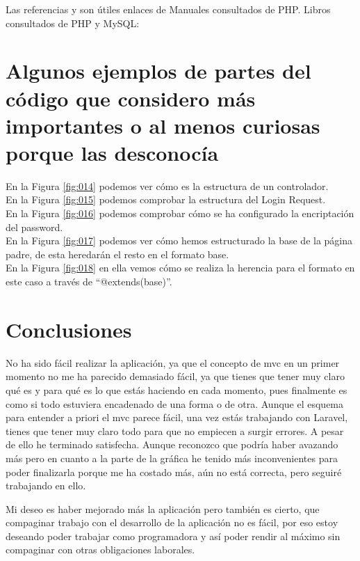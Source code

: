 \documentclass{article}
\begin{document}
Las referencias \cite{DocumentaciónPHP} y \cite{DocumentaciónPHPManual} son útiles enlaces de Manuales consultados de PHP.
Libros consultados de PHP y MySQL: \cite{cursoPHP_2021} \cite{PHP_8} \cite{ProgAvanza}

\section{Algunos ejemplos de partes del código que considero más importantes o al menos curiosas porque las desconocía}

En la Figura \ref{fig:014} podemos ver cómo es la estructura de un controlador.\\

En la Figura \ref{fig:015} podemos comprobar la estructura del Login Request.\\

En la Figura \ref{fig:016} podemos comprobar cómo se ha configurado la encriptación del password.\\

En la Figura \ref{fig:017} podemos ver cómo hemos estructurado la base de la página padre, de esta heredarán el resto en el formato base.\\

En la Figura \ref{fig:018} en ella vemos cómo se realiza la herencia para el formato en este caso  a través de ``@extends(base)''.




\section{Conclusiones}
No ha sido fácil realizar la aplicación, ya que el concepto de mvc en un primer momento no me ha parecido demasiado fácil, ya que tienes que tener muy claro qué es y para qué es lo que estás haciendo en cada momento, pues finalmente es como si todo estuviera encadenado de una forma o de otra. Aunque el esquema para entender a priori el mvc parece fácil, una vez estás trabajando con Laravel, tienes que tener muy claro todo para que no empiecen a surgir errores. A pesar de ello he terminado satisfecha. Aunque reconozco que podría haber avazando más pero en cuanto a la parte de la gráfica he tenido más inconvenientes para poder finalizarla porque me ha costado más, aún no está correcta, pero seguiré trabajando en ello. 


Mi deseo es haber mejorado más la aplicación pero también es cierto, que compaginar trabajo con el desarrollo de la aplicación no es fácil, por eso estoy deseando poder trabajar como programadora y así poder rendir al máximo sin compaginar con otras obligaciones laborales.
\end{document}
